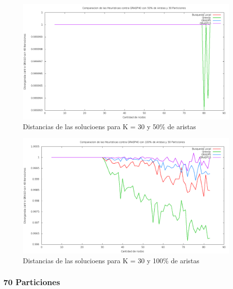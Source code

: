 \begin{figure}[H]
\begin{center}
\includegraphics[scale=0.3]{finales/muchosComparacionesCon30Particiones50Aristas.png}
\caption{Distancias de las solucioens para K = 30 y 50\% de aristas}
\end{center}
\end{figure}

\begin{figure}[H]
\begin{center}
\includegraphics[scale=0.3]{finales/muchosComparacionesCon30Particiones100Aristas.png}
\caption{Distancias de las solucioens para K = 30 y 100\% de aristas}
\end{center}
\end{figure}

\subsubsection{70 Particiones}

